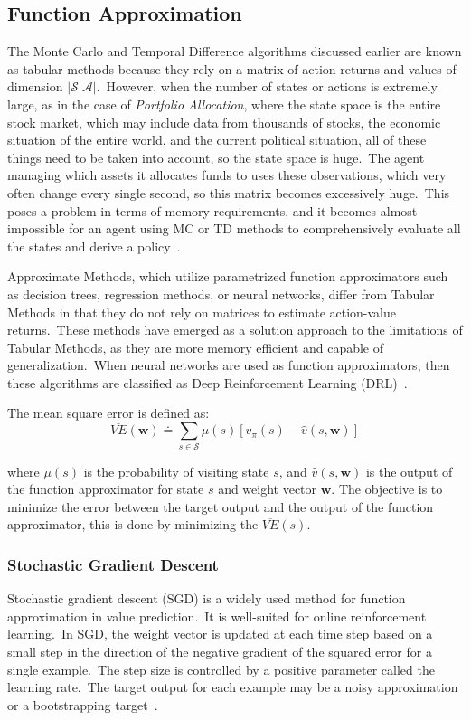 \documentclass[../xlapes02]{subfiles}
\begin{document}
    \subsection{Function Approximation}\label{subsec:function-approximation}
    The Monte Carlo and Temporal Difference algorithms discussed earlier are known as tabular methods because they rely on a matrix of action returns and values of dimension $|\mathcal{S}|\mathcal{A}|$.\ However, when the number of states or actions is extremely large, as in the case of \emph{Portfolio Allocation}, where the state space is the entire stock market, which may include data from thousands of stocks, the economic situation of the entire world, and the current political situation, all of these things need to be taken into account, so the state space is huge.\ The agent managing which assets it allocates funds to uses these observations, which very often change every single second, so this matrix becomes excessively huge.\ This poses a problem in terms of memory requirements, and it becomes almost impossible for an agent using MC or TD methods to comprehensively evaluate all the states and derive a policy~\cite{sutton2018reinforcement, FITMT25127}.

    Approximate Methods, which utilize parametrized function approximators such as decision trees, regression methods, or neural networks, differ from Tabular Methods in that they do not rely on matrices to estimate action-value returns.\ These methods have emerged as a solution approach to the limitations of Tabular Methods, as they are more memory efficient and capable of generalization.\ When neural networks are used as function approximators, then these algorithms are classified as Deep Reinforcement Learning (DRL)~\cite{FITMT25127}.

    The mean square error is defined as:
    \begin{equation}
        \label{eq:mean-square-error}
        \overline{VE}(\bm{w})\doteq\sum_{s\in\mathcal{S}}\mu(s)\left[v_{\pi}(s)-\hat{v}(s,\bm{w})\right]
    \end{equation}

    where $\mu(s)$ is the probability of visiting state $s$, and $\hat{v}(s,\bm{w})$ is the output of the function approximator for state $s$ and weight vector $\bm{w}$.
    The objective is to minimize the error between the target output and the output of the function approximator, this is done by minimizing the $\overline{VE}(s)$.

    \subsubsection{Stochastic Gradient Descent}\label{subsubsec:stochastic-gradient-descent}
    Stochastic gradient descent (SGD) is a widely used method for function approximation in value prediction.\ It is well-suited for online reinforcement learning.\ In SGD, the weight vector is updated at each time step based on a small step in the direction of the negative gradient of the squared error for a single example.\ The step size is controlled by a positive parameter called the learning rate.\ The target output for each example may be a noisy approximation or a bootstrapping target~\cite{sutton2018reinforcement}.
\end{document}

